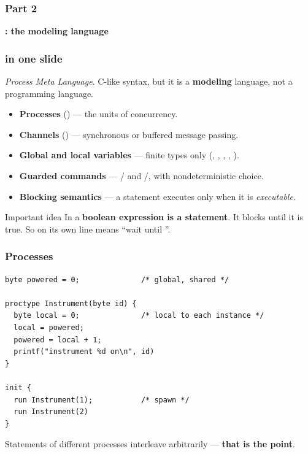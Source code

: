 \begin{frame}
  \frametitle{Part 2}

{\Large\bf \promelaname{}: the modeling language}

\end{frame}

\begin{frame}
  \frametitle{\promelaname{} in one slide} \small

{\em Process Meta Language}. C-like syntax, but it is a {\bf modeling} language,
not a programming language.

\vspace{0.3cm}

\begin{itemize}
\item {\bf Processes} () --- the units of concurrency.
\item {\bf Channels} () --- synchronous or buffered message passing.
\item {\bf Global and local variables} --- finite types only (, , , , ).
\item {\bf Guarded commands} --- / and /, with nondeterministic choice.
\item {\bf Blocking semantics} --- a statement executes only when it is {\em executable}.
\end{itemize}

\pause
\vspace{0.3cm}

\begin{block}{Important idea}\small
In \promelaname{} a {\bf boolean expression is a statement}. It blocks until it is
true. So  on its own line means ``wait until ''.
\end{block}

\end{frame}

\begin{frame}[fragile]
  \frametitle{Processes} \small

\begin{lstlisting}[language=promela]
byte powered = 0;              /* global, shared */

proctype Instrument(byte id) {
  byte local = 0;              /* local to each instance */
  local = powered;
  powered = local + 1;
  printf("instrument %d on\n", id)
}

init {
  run Instrument(1);           /* spawn */
  run Instrument(2)
}
\end{lstlisting}

\pause

Statements of different processes interleave arbitrarily --- {\bf that is the
point}.

\end{frame}

